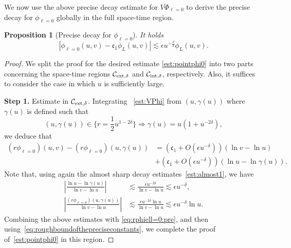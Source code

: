 \documentclass[a4paper,reqno]{amsart}
\newtheorem{proposition}[theorem]{Proposition}
\theoremstyle{definition}
\numberwithin{equation}{section}
\def\ep{\epsilon}
\def\lab{\label}
\begin{document}
We now use the above precise decay estimate for $V\Phi_{\ell=0}$ to derive the precise decay for $\phi_{\ell=0}$ globally in the full space-time region.

\begin{proposition}
[Precise decay for $\phi_{\ell=0}$]\label{Prop:pointphi0}
It holds
\begin{equation}\label{est:pointphi0}
\left|\phi_{\ell=0}(u,v)-\mathfrak{c}_{1}\phi_{L}(u,v)\right|\lesssim \ep u^{-\frac{\delta}{2}}{\phi_{L}}(u,v).
\end{equation}
\end{proposition}

\begin{proof}
We split the proof for the desired estimate \eqref{est:pointphi0} into two parts concerning the space-time regions $\mathcal{C}_{{\rm{ext}},\delta}$ and $\mathcal{C}_{{\rm{int}},\delta}$, respectively. Also, it suffices to consider the case in which $u$ is sufficiently large.

\smallskip
\textbf{Step 1.} Estimate in $\mathcal{C}_{{\rm{ext}},\delta}$.
Integrating ~\eqref{est:VPhi} from $(u,\gamma(u))$ where $\gamma(u)$ is defined such that 
\begin{equation*}
    (u,\gamma(u))\in \big\{r=\frac{1}{2}u^{1-2\delta}\big\}\Longrightarrow \gamma(u)=u\left(1+u^{-2\delta}\right),
\end{equation*}
we deduce that 
\begin{equation}
\lab{eq:rphiell=0:pre}
\begin{aligned}
(r\phi_{\ell=0})(u,v)-(r\phi_{\ell=0})(u,\gamma(u))&=({\mathfrak{c}}_{1}+O(\ep u^{-\delta}))(\ln v-\ln u)\\
&+({\mathfrak{c}}_{1}+O(\ep u^{-\delta}))(\ln u-\ln \gamma(u)).
\end{aligned}
\end{equation}
Note that, using again the almost sharp decay estimates~\eqref{est:almost1}, we have
\begin{equation*}
\begin{aligned}
\left|\frac{\ln u-\ln \gamma(u)}{\ln v-\ln u}\right|&\lesssim  \frac{\ep u^{-2\delta}}{\ln v-\ln u}\lesssim \ep u^{-\delta},\\
\left|\frac{(r\phi_{\ell=0})(u,\gamma(u))}{\ln v-\ln u}\right|
&\lesssim \frac{\ep u^{-2\delta}\ln u}{\ln v-\ln u}\lesssim \ep u^{-\delta}\ln u.
\end{aligned}
\end{equation*}
Combining the above estimates with \eqref{eq:rphiell=0:pre}, and then using~\eqref{eq:roughboundofthepreciseconstants}, we complete the proof of~\eqref{est:pointphi0} in this region.


\end{proof}
\end{document}
